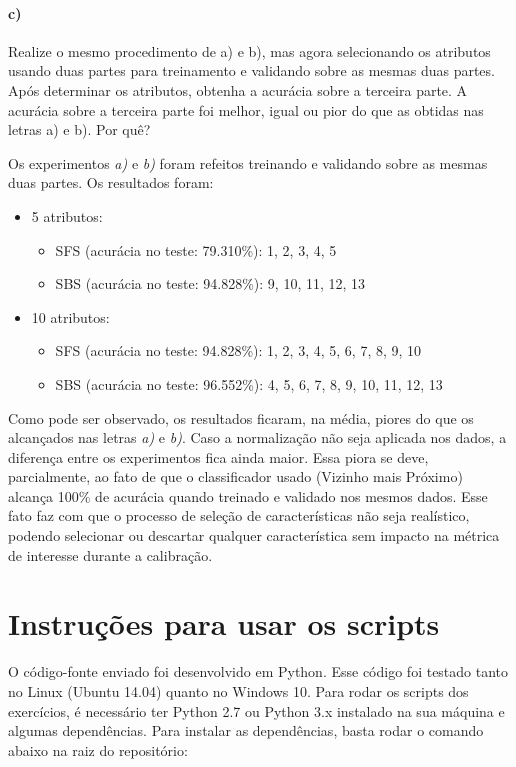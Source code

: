 \documentclass{article}
\begin{document}
\paragraph{c)} Realize o mesmo procedimento de a) e b), mas agora selecionando os atributos usando duas partes para treinamento e validando sobre as mesmas duas partes. Após determinar os atributos, obtenha a acurácia sobre a terceira parte. A acurácia sobre a terceira parte foi melhor, igual ou pior do que as obtidas nas letras a) e b). Por quê?

Os experimentos \textit{a)} e \textit{b)} foram refeitos treinando e validando sobre as mesmas duas partes. Os resultados foram:

\begin{itemize}
	\item 5 atributos:
		\begin{itemize}
			\item SFS (acurácia no teste: 79.310\%): 1, 2, 3, 4, 5
			\item SBS (acurácia no teste: 94.828\%): 9, 10, 11, 12, 13
		\end{itemize}
	\item 10 atributos:
		\begin{itemize}
			\item SFS (acurácia no teste: 94.828\%): 1, 2, 3, 4, 5, 6, 7, 8, 9, 10
			\item SBS (acurácia no teste: 96.552\%): 4, 5, 6, 7, 8, 9, 10, 11, 12, 13
		\end{itemize}
\end{itemize}

Como pode ser observado, os resultados ficaram, na média, piores do que os alcançados nas letras \textit{a)} e \textit{b)}. Caso a normalização não seja aplicada nos dados, a diferença entre os experimentos fica ainda maior. Essa piora se deve, parcialmente, ao fato de que o classificador usado (Vizinho mais Próximo) alcança 100\% de acurácia quando treinado e validado nos mesmos dados. Esse fato faz com que o processo de seleção de características não seja realístico, podendo selecionar ou descartar qualquer característica sem impacto na métrica de interesse durante a calibração.

\section*{Instruções para usar os scripts}

O código-fonte enviado foi desenvolvido em Python. Esse código foi testado tanto no Linux (Ubuntu 14.04) quanto no Windows 10. Para rodar os scripts dos exercícios, é necessário ter Python 2.7 ou Python 3.x instalado na sua máquina e algumas dependências. Para instalar as dependências, basta rodar o comando abaixo na raiz do repositório:
\end{document}
